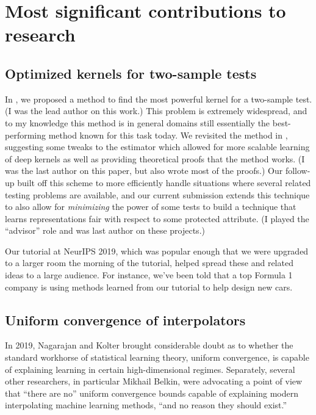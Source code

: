 \documentclass[12pt]{article}
\begin{document}
\nocite{*}

\section{Most significant contributions to research}

\subsection{Optimized kernels for two-sample tests} \label{sec:testing}

In \cite{sutherland:opt-mmd}, we proposed a method to find the most powerful kernel for a two-sample test. (I was the lead author on this work.) This problem is extremely widespread, and to my knowledge this method is in general domains still essentially the best-performing method known for this task today. We revisited the method in \cite{liu:deep-testing}, suggesting some tweaks to the estimator which allowed for more scalable learning of deep kernels as well as providing theoretical proofs that the method works. (I was the last author on this paper, but also wrote most of the proofs.)
Our follow-up \cite{liu:meta-2st} built off this scheme to more efficiently handle situations where several related testing problems are available,
and our current submission \cite{deka:mmd-bfair} extends this technique to also allow for \emph{minimizing} the power of some tests to build a technique that learns representations fair with respect to some protected attribute.
(I played the ``advisor'' role and was last author on these projects.)

Our tutorial at NeurIPS 2019, which was popular enough that we were upgraded to a larger room the morning of the tutorial, helped spread these and related ideas to a large audience. For instance, we've been told that a top Formula 1 company is using methods learned from our tutorial to help design new cars.

\subsection{Uniform convergence of interpolators} \label{sec:interpolators}
In 2019, Nagarajan and Kolter brought considerable doubt as to whether the standard workhorse of statistical learning theory, uniform convergence, is capable of explaining learning in certain high-dimensional regimes. Separately, several other researchers, in particular Mikhail Belkin, were advocating a point of view that ``there are no'' uniform convergence bounds capable of explaining modern interpolating machine learning methods, ``and no reason they should exist.''
\end{document}
